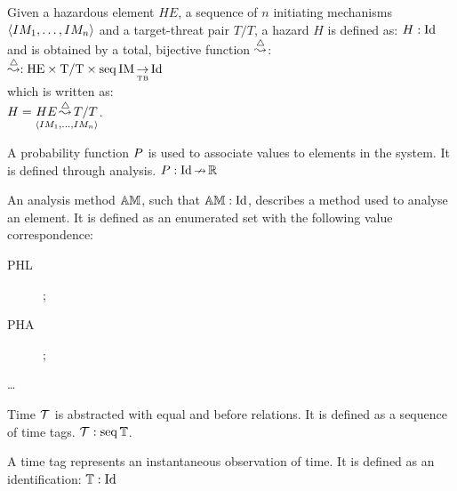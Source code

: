 \begin{definition}[Hazard]
Given a hazardous element $HE$, a sequence of $n$ initiating mechanisms $\hmseqenum{IM_1, \ldots, IM_n}$ and a target-threat pair $T/T$, a hazard $H$ is defined as: $H: \hmdatatypeId$ and is obtained by a total, bijective function $\hmhazardsymbol$: 
%
\\$\hmhazardsymbol: \hmtotalbijectivefunction{\hmcartesian{\hmcartesian{\hmdatatypeHE}{\hmdatatypeTT}}{\hmseq{\hmdatatypeIM}}}{\hmdatatypeId}$
%
\\which is written as:
%
\\$H = \hmhazard{HE}{\hmseqenum{IM_1, \ldots, IM_n}}{T/T}$.
\end{definition}

\begin{definition}
A probability function $\hmprobabilitysymbol$ is used to associate values to elements in the system.
%
It is defined through analysis. 
%
$\hmprobabilitysymbol: \hmpartialfunction{\hmdatatypeId}{\hmdatatypeR}$
\end{definition}

\begin{definition}
An analysis method $\hmdatatypeAM$, such that $\hmdatatypeAM: \hmdatatypeId$, describes a method used to analyse an element. 
%
It is defined as an enumerated set with the following value correspondence:
%
\begin{description}
  \item[PHL] \PHL;
  \item[PHA] \PHA;
  \item[\ldots] 
\end{description}
\end{definition}

\begin{definition}[Time]
Time $\hmdatatypetime$ is abstracted with equal and before relations. 
%
It is defined as a sequence of time tags.
%
$\hmdatatypetime: \hmseq{\hmdatatypetimetag}$.
\end{definition}

\begin{definition}
A time tag represents an instantaneous observation of time.
%
It is defined as an identification: $\hmdatatypetimetag: \hmdatatypeId$
\end{definition}

